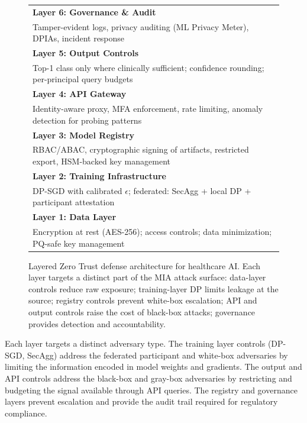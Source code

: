 \documentclass[conference]{IEEEtran}
\begin{document}
	\begin{figure}[H]
		\centering
		\footnotesize
		\setlength{\tabcolsep}{3pt}
		\begin{tabular}{|p{7.5cm}|}
			\hline
			\textbf{Layer 6: Governance \& Audit}\\
			Tamper-evident logs, privacy auditing (ML Privacy Meter), DPIAs, incident response\\
			\hline
			\textbf{Layer 5: Output Controls}\\
			Top-1 class only where clinically sufficient; confidence rounding; per-principal query budgets\\
			\hline
			\textbf{Layer 4: API Gateway}\\
			Identity-aware proxy, MFA enforcement, rate limiting, anomaly detection for probing patterns\\
			\hline
			\textbf{Layer 3: Model Registry}\\
			RBAC/ABAC, cryptographic signing of artifacts, restricted export, HSM-backed key management\\
			\hline
			\textbf{Layer 2: Training Infrastructure}\\
			DP-SGD with calibrated $\epsilon$; federated: SecAgg + local DP + participant attestation\\
			\hline
			\textbf{Layer 1: Data Layer}\\
			Encryption at rest (AES-256); access controls; data minimization; PQ-safe key management\\
			\hline
		\end{tabular}
		\caption{Layered Zero Trust defense architecture for healthcare AI. Each layer targets a distinct part of the MIA attack surface: data-layer controls reduce raw exposure; training-layer DP limits leakage at the source; registry controls prevent white-box escalation; API and output controls raise the cost of black-box attacks; governance provides detection and accountability.}
		\label{fig:arch}
	\end{figure}

	Each layer targets a distinct adversary type. The training layer controls (DP-SGD, SecAgg) address the federated participant and white-box adversaries by limiting the information encoded in model weights and gradients. The output and API controls address the black-box and gray-box adversaries by restricting and budgeting the signal available through API queries. The registry and governance layers prevent escalation and provide the audit trail required for regulatory compliance.
\end{document}
